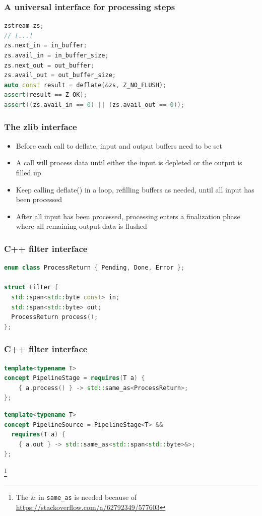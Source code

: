 \documentclass[aspectratio=169]{beamer}
\newif\iftransitions
\begin{document}
\begin{frame}

\end{frame}

\begin{frame}[fragile]
    \frametitle{A universal interface for processing steps}
    \iftransitions \pause \fi

    \begin{lstlisting}[language={C++}]
zstream zs;
// [...]
zs.next_in = in_buffer;
zs.avail_in = in_buffer_size;
zs.next_out = out_buffer;
zs.avail_out = out_buffer_size;
auto const result = deflate(&zs, Z_NO_FLUSH);
assert(result == Z_OK);
assert((zs.avail_in == 0) || (zs.avail_out == 0));
    \end{lstlisting}
\end{frame}

\begin{frame}
  \frametitle{The zlib interface}
  
  \begin{itemize}
  \item Before each call to deflate, input and output buffers need to be set
  \item A call will process data until either the input is depleted or the output is filled up
  \item Keep calling deflate() in a loop, refilling buffers as needed, until all input has been processed
  \item After all input has been processed, processing enters a finalization phase where all remaining output data is flushed
  \end{itemize}
\end{frame}

\begin{frame}[fragile]
    \frametitle{C++ filter interface}
    
    \begin{lstlisting}[language={C++}]
enum class ProcessReturn { Pending, Done, Error };

struct Filter {
  std::span<std::byte const> in;
  std::span<std::byte> out;
  ProcessReturn process();
};
    \end{lstlisting}
    
\end{frame}

\begin{frame}[fragile]
    \frametitle{C++ filter interface}
    
    \begin{lstlisting}[language={C++}]
template<typename T>
concept PipelineStage = requires(T a) {
    { a.process() } -> std::same_as<ProcessReturn>;
};
\end{lstlisting}
\iftransitions \pause \fi
\begin{lstlisting}[language={C++}]
template<typename T>
concept PipelineSource = PipelineStage<T> &&
  requires(T a) {
    { a.out } -> std::same_as<std::span<std::byte>&>;
};
    \end{lstlisting}
    \footnote{The \& in \texttt{same\_as} is needed because of \href{https://stackoverflow.com/a/62792349/577603}{https://stackoverflow.com/a/62792349/577603}}
\end{frame}
\end{document}
